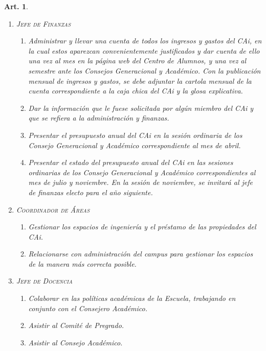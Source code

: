 \documentclass[letterpaper,11pt]{article}
\theoremstyle{plain}
\newtheorem{art}{Art.} %
\begin{document}
\begin{art}
\begin{enumerate}
				\item \textsc{Jefe de Finanzas}
					\begin{enumerate}
						\item Administrar y llevar una cuenta de todos los ingresos y gastos del CAi, en la cual estos aparezcan convenientemente justificados y dar cuenta de ello una vez al mes en la página web del Centro de Alumnos, y una vez al semestre ante los Consejos Generacional y Académico. Con la publicación mensual de ingresos y gastos, se debe adjuntar la cartola mensual de la cuenta correspondiente a la caja chica del CAi y la glosa explicativa.
						
						\item Dar la información que le fuese solicitada por algún miembro del CAi y que se refiera a la administración y finanzas.
						
						\item Presentar el presupuesto anual del CAi en la sesión ordinaria de los  Consejo Generacional y Académico correspondiente al mes de abril.
						
						\item Presentar el estado del presupuesto anual del CAi en las sesiones ordinarias de los Consejo Generacional y Académico correspondientes al mes de julio y noviembre. En la sesión de noviembre, se invitará al jefe de finanzas electo para el año siguiente.
					\end{enumerate}

				\item \textsc{Coordinador de Áreas}
					\begin{enumerate}
						\item Gestionar los espacios de ingeniería y el préstamo de las propiedades del CAi.
						\item Relacionarse con administración del campus para gestionar los espacios de la manera más correcta posible.
					\end{enumerate}

				\item \textsc{Jefe de Docencia}
					\begin{enumerate}
						\item Colaborar en las políticas académicas de la Escuela, trabajando en conjunto con el Consejero Académico.
						
						\item Asistir al Comité de Pregrado.
						
						\item Asistir al Consejo Académico.
					\end{enumerate}


\end{enumerate}
\end{art}
\end{document}
